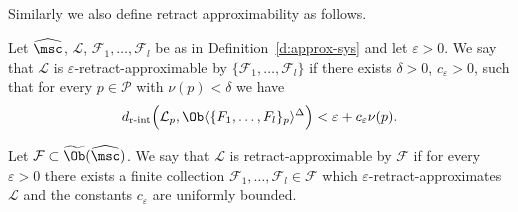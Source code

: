 Similarly we also define retract approximability as follows. 
\begin{dfn} \label{d:approx-sys-ret} Let $\widehat{\msc}$,
  $\mathcal{L}$, $\mathcal{F}_1, \ldots, \mathcal{F}_l$ be as in
  Definition~\ref{d:approx-sys} and let $\varepsilon>0$. We say that
  $\mathcal{L}$ is $\varepsilon$-retract-approximable by
  $\{\mathcal{F}_1, \ldots, \mathcal{F}_l\}$ if there exists
  $\delta>0$, $c_{\varepsilon}>0$, such that for every $p \in \mathcal{P}$ with
  $\nu(p) < \delta$ we have
  $${d}_{\text{r-int}} \Bigl(\mathcal{L}_p,
  \Ob \langle \{F_1, \ldots, F_l\}_p \rangle^{\Delta} \Bigr)
  < \varepsilon +c_{\varepsilon}\nu(p).$$

  Let $\mathcal{F} \subset \widetilde{\Ob}(\widehat{\msc})$. We say
  that $\mathcal{L}$ is retract-approximable by $\mathcal{F}$ if for
  every $\varepsilon>0$ there exists a finite collection
  $\mathcal{F}_1, \ldots, \mathcal{F}_l \in \mathcal{F}$ which
  $\varepsilon$-retract-approximates $\mathcal{L}$ and the constants
  $c_{\varepsilon}$ are uniformly bounded.
\end{dfn}


